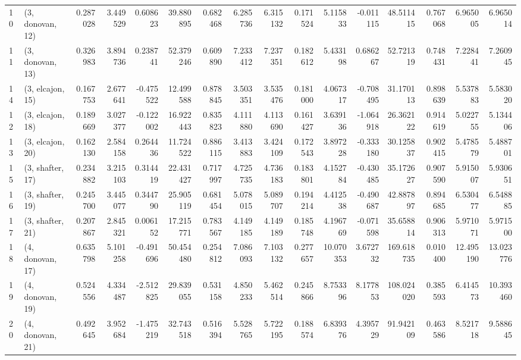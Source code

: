 \begin{tabular}{llrrrrrrrrrrrrrr}
10 &  (3, donovan, 12) &   0.287028 &  3.449529 &  0.608623 &  39.880895 &  0.682468 &   6.285736 &  6.315132 &  0.171524 &   5.115833 & -0.011115 &   48.511415 &  0.767068 &   6.965005 &   6.965014 \\
11 &  (3, donovan, 13) &   0.326983 &  3.894736 &  0.238741 &  52.379246 &  0.609890 &   7.233412 &  7.237351 &  0.182612 &   5.433198 &  0.686267 &   52.721319 &  0.748431 &   7.228441 &   7.260945 \\
14 &  (3, elcajon, 15) &   0.167753 &  2.677641 & -0.475522 &  12.499588 &  0.878845 &   3.503351 &  3.535476 &  0.181000 &   4.067317 & -0.708495 &   31.170113 &  0.898639 &   5.537883 &   5.583020 \\
12 &  (3, elcajon, 18) &   0.189669 &  3.027377 & -0.122002 &  16.922443 &  0.835823 &   4.111880 &  4.113690 &  0.161427 &   3.639136 & -1.064918 &   26.362122 &  0.914619 &   5.022755 &   5.134406 \\
13 &  (3, elcajon, 20) &   0.162130 &  2.584158 &  0.264436 &  11.724522 &  0.886115 &   3.413883 &  3.424109 &  0.172543 &   3.897228 & -0.333180 &   30.125837 &  0.902415 &   5.478579 &   5.488701 \\
15 &  (3, shafter, 17) &   0.234882 &  3.215103 &  0.314419 &  22.431427 &  0.717997 &   4.725735 &  4.736183 &  0.183801 &   4.152784 & -0.430485 &   35.172627 &  0.907590 &   5.915007 &   5.930651 \\
16 &  (3, shafter, 19) &   0.245700 &  3.445077 &  0.344790 &  25.905119 &  0.681454 &   5.078015 &  5.089707 &  0.194214 &   4.412538 & -0.490687 &   42.887897 &  0.894685 &   6.530477 &   6.548885 \\
17 &  (3, shafter, 21) &   0.207867 &  2.845321 &  0.006152 &  17.215771 &  0.783567 &   4.149185 &  4.149189 &  0.185748 &   4.196769 & -0.071598 &   35.658814 &  0.906313 &   5.971071 &   5.971500 \\
18 &  (4, donovan, 17) &   0.635798 &  5.101258 & -0.491696 &  50.454480 &  0.254812 &   7.086093 &  7.103132 &  0.277657 &  10.070353 &  3.672732 &  169.618735 &  0.010400 &  12.495190 &  13.023776 \\
19 &  (4, donovan, 19) &   0.524556 &  4.334487 & -2.512825 &  29.839055 &  0.531158 &   4.850233 &  5.462514 &  0.245866 &   8.753396 &  8.177853 &  108.024020 &  0.385593 &   6.414573 &  10.393460 \\
20 &  (4, donovan, 21) &   0.492645 &  3.952684 & -1.475219 &  32.743518 &  0.516394 &   5.528765 &  5.722195 &  0.188574 &   6.839376 &  4.395729 &   91.942109 &  0.463586 &   8.521718 &   9.588645 \\

\end{tabular}
